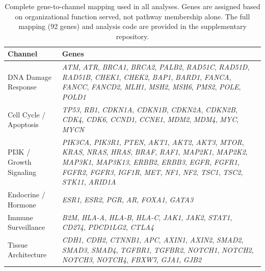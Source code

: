 \documentclass[11pt]{article}
\begin{document}
\begin{landscape}
\begin{table}[p]
\centering
\caption{Complete gene-to-channel mapping used in all analyses.
Genes are assigned based on organizational function served, not
pathway membership alone. The full mapping (92 genes) and analysis
code are provided in the supplementary repository.}
\label{tab:gene-mapping}
\begin{tabular}{@{}>{\raggedright}p{4.5cm}>{\raggedright\arraybackslash}p{18cm}@{}}
\toprule
\textbf{Channel} & \textbf{Genes} \\
\midrule
DNA Damage Response &
  \emph{ATM}, \emph{ATR}, \emph{BRCA1}, \emph{BRCA2}, \emph{PALB2},
  \emph{RAD51C}, \emph{RAD51D}, \emph{RAD51B}, \emph{CHEK1},
  \emph{CHEK2}, \emph{BAP1}, \emph{BARD1}, \emph{FANCA},
  \emph{FANCC}, \emph{FANCD2}, \emph{MLH1}, \emph{MSH2},
  \emph{MSH6}, \emph{PMS2}, \emph{POLE}, \emph{POLD1} \\[6pt]
Cell Cycle / Apoptosis &
  \emph{TP53}, \emph{RB1}, \emph{CDKN1A}, \emph{CDKN1B},
  \emph{CDKN2A}, \emph{CDKN2B}, \emph{CDK4}, \emph{CDK6},
  \emph{CCND1}, \emph{CCNE1}, \emph{MDM2}, \emph{MDM4},
  \emph{MYC}, \emph{MYCN} \\[6pt]
PI3K / Growth Signaling &
  \emph{PIK3CA}, \emph{PIK3R1}, \emph{PTEN}, \emph{AKT1},
  \emph{AKT2}, \emph{AKT3}, \emph{MTOR}, \emph{KRAS}, \emph{NRAS},
  \emph{HRAS}, \emph{BRAF}, \emph{RAF1}, \emph{MAP2K1},
  \emph{MAP2K2}, \emph{MAP3K1}, \emph{MAP3K13}, \emph{ERBB2},
  \emph{ERBB3}, \emph{EGFR}, \emph{FGFR1}, \emph{FGFR2},
  \emph{FGFR3}, \emph{IGF1R}, \emph{MET}, \emph{NF1}, \emph{NF2},
  \emph{TSC1}, \emph{TSC2}, \emph{STK11}, \emph{ARID1A} \\[6pt]
Endocrine / Hormone &
  \emph{ESR1}, \emph{ESR2}, \emph{PGR}, \emph{AR}, \emph{FOXA1},
  \emph{GATA3} \\[6pt]
Immune Surveillance &
  \emph{B2M}, \emph{HLA-A}, \emph{HLA-B}, \emph{HLA-C},
  \emph{JAK1}, \emph{JAK2}, \emph{STAT1}, \emph{CD274},
  \emph{PDCD1LG2}, \emph{CTLA4} \\[6pt]
Tissue Architecture &
  \emph{CDH1}, \emph{CDH2}, \emph{CTNNB1}, \emph{APC},
  \emph{AXIN1}, \emph{AXIN2}, \emph{SMAD2}, \emph{SMAD3},
  \emph{SMAD4}, \emph{TGFBR1}, \emph{TGFBR2}, \emph{NOTCH1},
  \emph{NOTCH2}, \emph{NOTCH3}, \emph{NOTCH4}, \emph{FBXW7},
  \emph{GJA1}, \emph{GJB2} \\
\bottomrule
\end{tabular}
\end{table}

\end{landscape}
\end{document}
